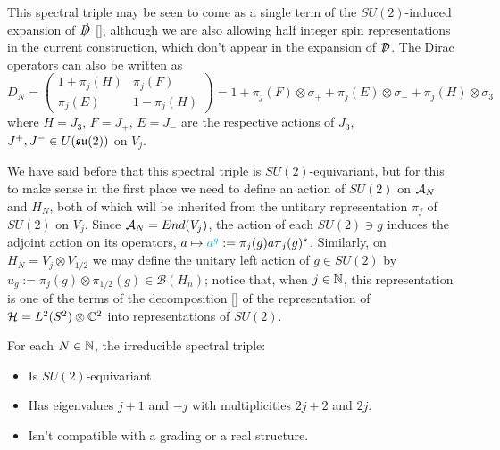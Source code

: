 This spectral triple may be seen to come as a single term of the $SU(2)$-induced expansion of $\slashed D$ \eqref{}, although we are also allowing  half integer spin representations in the current construction, which don't appear in the expansion of $\slashed {\mathcal D}$. The Dirac operators can also be written as
\begin{equation}
    D_N = \begin{pmatrix} 1 + \pi_j(H) & \pi_j(F) \\ \pi_j(E) & 1 - \pi_j(H)\end{pmatrix} 
    = 1 + \pi_j(F) \otimes \sigma_+ + \pi_j(E) \otimes \sigma_- + \pi_j(H) \otimes \sigma_3
\end{equation}
where $H = J_3$, $F = J_+$, $E = J_-$ are the respective actions of $J_3$, $J^+, J^- \in U(\mathfrak{su}(2))$ on $V_j$.

We have said before that this spectral triple is $SU(2)$-equivariant, but for this to make sense in the first place we need to define an action of $SU(2)$ on $\mathcal A_N$ and $H_N$, both of which will be inherited from the untitary representation $\pi_j$ of $SU(2)$ on $V_j$. Since $\mathcal A_N = End(V_j)$, the action of each $SU(2) \ni g$ induces the adjoint action on its operators, $a \mapsto \textcolor{cyan}{a^g} := \pi_j(g) a \pi_j(g)^*$. Similarly, on $H_N = V_j \otimes V_{1/2}$ we may define the unitary left action of $g \in SU(2)$ by $u_g := \pi_j(g) \otimes \pi_{1/2}(g) \in \mathcal B(H_n)$; notice that, when $j \in \mathbb{N}$, this representation is one of the terms of the decomposition \eqref{} of the representation of $\mathcal H = L^2(S^2) \otimes \mathbb{C}^2$ into representations of $SU(2)$.

\begin{proposition}\label{propIrredSpectralTriple}
For each $N \in \mathbb{N}$, the irreducible spectral triple:

    \begin{itemize}
        
    \item Is $SU(2)$-equivariant
    
    \item Has eigenvalues $j+1$ and $-j$ with multiplicities $2j+2$ and $2j$.
        
    \item Isn't compatible with a grading or a real structure.
    \end{itemize}
\end{proposition}

